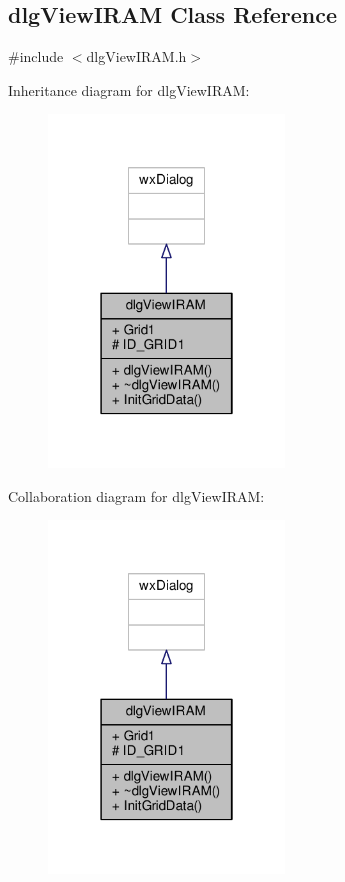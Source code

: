 \subsection{dlg\+View\+I\+R\+AM Class Reference}
\label{classdlgViewIRAM}


{\ttfamily \#include $<$dlg\+View\+I\+R\+A\+M.\+h$>$}



Inheritance diagram for dlg\+View\+I\+R\+AM\+:
\nopagebreak
\begin{figure}[H]
\begin{center}
\leavevmode
\includegraphics[width=178pt]{da/d43/classdlgViewIRAM__inherit__graph}
\end{center}
\end{figure}


Collaboration diagram for dlg\+View\+I\+R\+AM\+:
\nopagebreak
\begin{figure}[H]
\begin{center}
\leavevmode
\includegraphics[width=178pt]{d5/dea/classdlgViewIRAM__coll__graph}
\end{center}
\end{figure}
